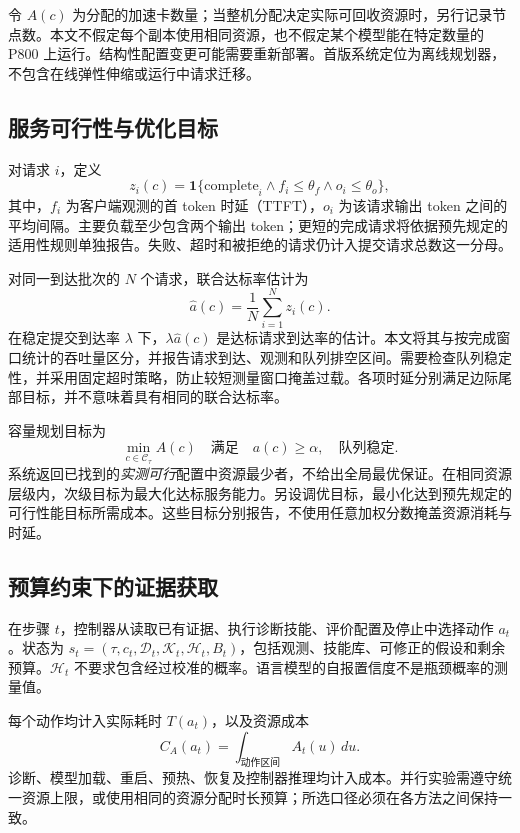 \documentclass[UTF8,11pt,a4paper,fontset=windows]{ctexart}
\begin{document}
令 $A(c)$ 为分配的加速卡数量；当整机分配决定实际可回收资源时，另行记录节点数。本文不假定每个副本使用相同资源，也不假定某个模型能在特定数量的 P800 上运行。结构性配置变更可能需要重新部署。首版系统定位为离线规划器，不包含在线弹性伸缩或运行中请求迁移。

\subsection{服务可行性与优化目标}
对请求 $i$，定义
\begin{equation}
 z_i(c)=\mathbf{1}\{\text{complete}_i \land f_i\leq\theta_f
                  \land o_i\leq\theta_o\},
\end{equation}
其中，$f_i$ 为客户端观测的首 token 时延（TTFT），$o_i$ 为该请求输出 token 之间的平均间隔。主要负载至少包含两个输出 token；更短的完成请求将依据预先规定的适用性规则单独报告。失败、超时和被拒绝的请求仍计入提交请求总数这一分母。

对同一到达批次的 $N$ 个请求，联合达标率估计为
\begin{equation}
 \widehat a(c)=\frac{1}{N}\sum_{i=1}^{N}z_i(c).
\end{equation}
在稳定提交到达率 $\lambda$ 下，$\lambda\widehat a(c)$ 是达标请求到达率的估计。本文将其与按完成窗口统计的吞吐量区分，并报告请求到达、观测和队列排空区间。需要检查队列稳定性，并采用固定超时策略，防止较短测量窗口掩盖过载。各项时延分别满足边际尾部目标，并不意味着具有相同的联合达标率。

容量规划目标为
\begin{equation}
 \min_{c\in\mathcal{C}_{\tau}} A(c)
 \quad\text{满足}\quad
 a(c)\geq\alpha,\quad\text{队列稳定}.
 \label{eq:capacity}
\end{equation}
系统返回已找到的\emph{实测可行}配置中资源最少者，不给出全局最优保证。在相同资源层级内，次级目标为最大化达标服务能力。另设调优目标，最小化达到预先规定的可行性能目标所需成本。这些目标分别报告，不使用任意加权分数掩盖资源消耗与时延。

\subsection{预算约束下的证据获取}
在步骤 $t$，控制器从读取已有证据、执行诊断技能、评价配置及停止中选择动作 $a_t$。状态为 $s_t=(\tau,c_t,\mathcal{D}_t,\mathcal{K}_t,\mathcal{H}_t,B_t)$，包括观测、技能库、可修正的假设和剩余预算。$\mathcal{H}_t$ 不要求包含经过校准的概率。语言模型的自报置信度不是瓶颈概率的测量值。

每个动作均计入实际耗时 $T(a_t)$，以及资源成本
\begin{equation}
 C_A(a_t)=\int_{\text{动作区间}} A_t(u)\,du.
\end{equation}
诊断、模型加载、重启、预热、恢复及控制器推理均计入成本。并行实验需遵守统一资源上限，或使用相同的资源分配时长预算；所选口径必须在各方法之间保持一致。
\end{document}
